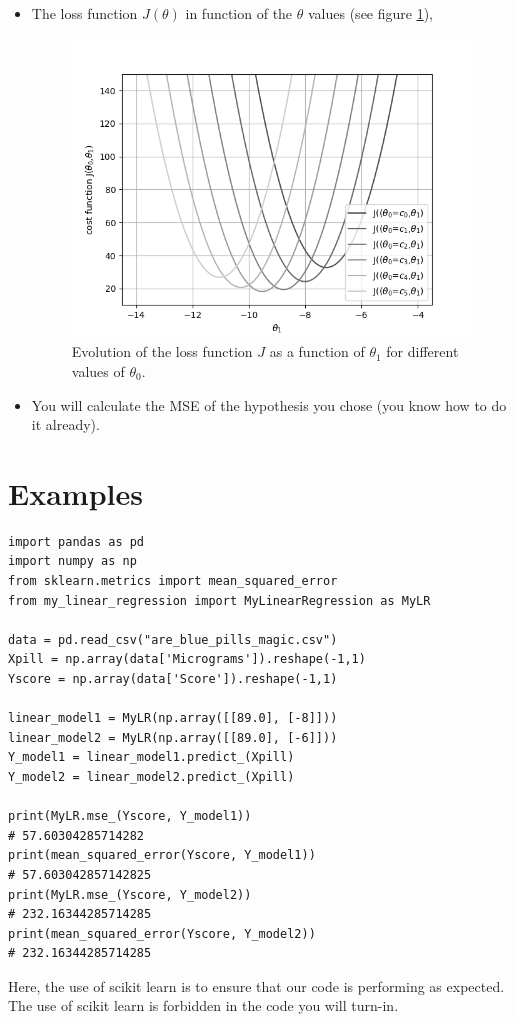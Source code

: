 \documentclass{42-en}
\begin{document}
\begin{itemize}
  \item The loss function $J(\theta)$ in function of the $\theta$ values (see figure \ref{loss function qs function of theta1 and theta0}),
  \begin{figure}[!h]
    \centering
    \includegraphics[scale=0.6]{assets/ex04_J_vs_t1.png}
    \caption{Evolution of the loss function $J$ as a function of $\theta_1$ for different values of $\theta_0$.}
    \label{loss function qs function of theta1 and theta0}
  \end{figure}
   
  \item You will calculate the MSE of the hypothesis you chose (you know how to do it already).
\end{itemize}

\section*{Examples}
\begin{verbatim}
import pandas as pd
import numpy as np
from sklearn.metrics import mean_squared_error
from my_linear_regression import MyLinearRegression as MyLR

data = pd.read_csv("are_blue_pills_magic.csv")
Xpill = np.array(data['Micrograms']).reshape(-1,1)
Yscore = np.array(data['Score']).reshape(-1,1)

linear_model1 = MyLR(np.array([[89.0], [-8]]))
linear_model2 = MyLR(np.array([[89.0], [-6]]))
Y_model1 = linear_model1.predict_(Xpill)
Y_model2 = linear_model2.predict_(Xpill)

print(MyLR.mse_(Yscore, Y_model1))
# 57.60304285714282
print(mean_squared_error(Yscore, Y_model1))
# 57.603042857142825
print(MyLR.mse_(Yscore, Y_model2))
# 232.16344285714285
print(mean_squared_error(Yscore, Y_model2))
# 232.16344285714285
\end{verbatim}
\par
Here, the use of scikit learn is to ensure that our code is performing as expected. The use of scikit learn is forbidden in the code you will turn-in.
\end{document}
